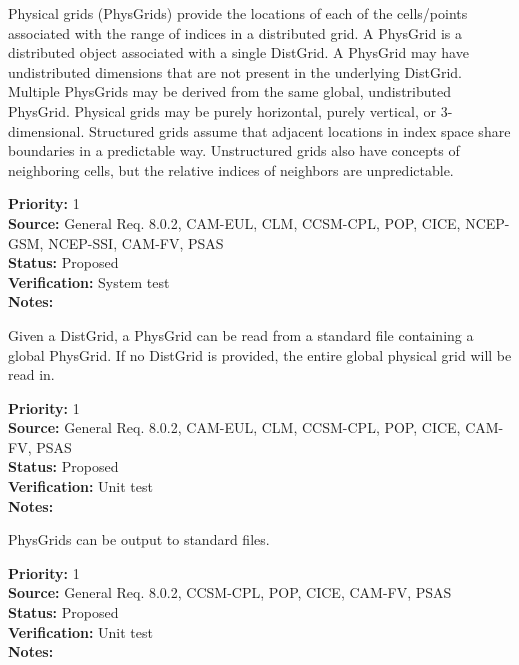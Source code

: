 
Physical grids (PhysGrids) provide the locations of each of the cells/points
associated with the range of indices in a distributed grid.  A PhysGrid is a
distributed object associated with a single DistGrid.  A PhysGrid may have
undistributed dimensions that are not present in the underlying DistGrid. 
Multiple PhysGrids may be derived from the same global, undistributed PhysGrid. 
Physical grids may be purely horizontal, purely vertical, or 3-dimensional. 
Structured grids assume that adjacent locations in index space share boundaries
in a predictable way.  Unstructured grids also have concepts of neighboring
cells, but the relative indices of neighbors are unpredictable.

\begin{reqlist}
{\bf Priority:} 1 \\
{\bf Source:} General Req. 8.0.2, CAM-EUL, CLM, CCSM-CPL, POP, CICE, NCEP-GSM, NCEP-SSI,
     CAM-FV, PSAS \\
{\bf Status:} Proposed \\
{\bf Verification:} System test\\
{\bf Notes:}
\end{reqlist}

Given a DistGrid, a PhysGrid can be read from a standard file containing a
global PhysGrid. If no DistGrid is provided, the entire global physical grid will
be read in.
\begin{reqlist}
{\bf Priority:} 1 \\
{\bf Source:} General Req. 8.0.2, CAM-EUL, CLM, CCSM-CPL, POP, CICE, 
              CAM-FV, PSAS \\
{\bf Status:} Proposed \\
{\bf Verification:} Unit test\\
{\bf Notes:} 
\end{reqlist}

PhysGrids can be output to standard files.
\begin{reqlist}
{\bf Priority:} 1 \\
{\bf Source:} General Req. 8.0.2, CCSM-CPL, POP, CICE, 
              CAM-FV, PSAS \\
{\bf Status:} Proposed \\
{\bf Verification:} Unit test\\
{\bf Notes:} 
\end{reqlist}

